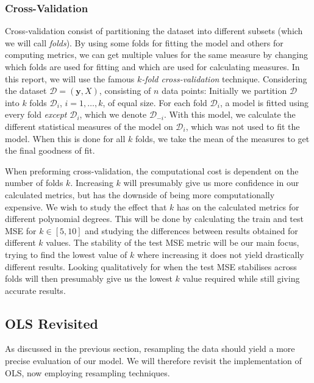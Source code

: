 \documentclass[twocolumn,english,notitlepage]{article}
\renewcommand{\vec}[1]{\boldsymbol{#1}}
\begin{document}
        \subsubsection{Cross-Validation}
            Cross-validation consist of partitioning the dataset into different subsets (which we will call \textit{folds}). By using some folds for fitting the model and others for computing metrics, we can get multiple values for the same measure by changing which folds are used for fitting and which are used for calculating measures. 
            \newline\newline
            In this report, we will use the famous \textit{$k$-fold cross-validation} technique. Considering the dataset $\mathcal{D} = (\vec{y}, X)$, consisting of $n$ data points: Initially we partition $\mathcal{D}$ into $k$ folds $\mathcal{D}_i$, $i = 1, \ldots , k$, of equal size. For each fold $\mathcal{D}_i$, a model is fitted using every fold \textit{except} $\mathcal{D}_i$, which we denote $\mathcal{D}_{-i}$. With this model, we calculate the different statistical measures of the model on $\mathcal{D}_i$, which was not used to fit the model. When this is done for all $k$ folds, we take the mean of the measures to get the final goodness of fit. 

            When preforming cross-validation, the computational cost is dependent on the number of folds $k$. Increasing $k$ will presumably give us more confidence in our calculated metrics, but has the downside of being more computationally expensive. We wish to study the effect that $k$ has on the calculated metrics for different polynomial degrees. This will be done by calculating the train and test MSE for $k \in [5,10]$ and studying the differences between results obtained for different  $k$ values. The stability of the test MSE metric will be our main focus, trying to find the lowest value of $k$ where increasing it does not yield drastically different results. Looking qualitatively for when the test MSE stabilises across folds will then presumably give us the lowest $k$ value required while still giving accurate results.

    \subsection{OLS Revisited}
        As discussed in the previous section, resampling the data should yield a more precise evaluation of our model. We will therefore revisit the implementation of OLS, now employing resampling techniques. 
\end{document}
